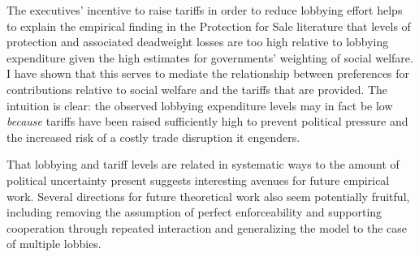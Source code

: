 \documentclass[10pt]{article}
\begin{document}
The executives' incentive to raise tariffs in order to reduce lobbying effort helps to explain the empirical finding in the Protection for Sale literature that levels of protection and associated deadweight losses are too high relative to lobbying expenditure given the high estimates for governments' weighting of social welfare. I have shown that this serves to mediate the relationship between preferences for contributions relative to social welfare and the tariffs that are provided. The intuition is clear: the observed lobbying expenditure levels may in fact be low \textit{because} tariffs have been raised sufficiently high to prevent political pressure and the increased risk of a costly trade disruption it engenders.

That lobbying and tariff levels are related in systematic ways to the amount of political uncertainty present suggests interesting avenues for future empirical work. Several directions for future theoretical work also seem potentially fruitful, including removing the assumption of perfect enforceability and supporting cooperation through repeated interaction and generalizing the model to the case of multiple lobbies.

			
\end{document}
